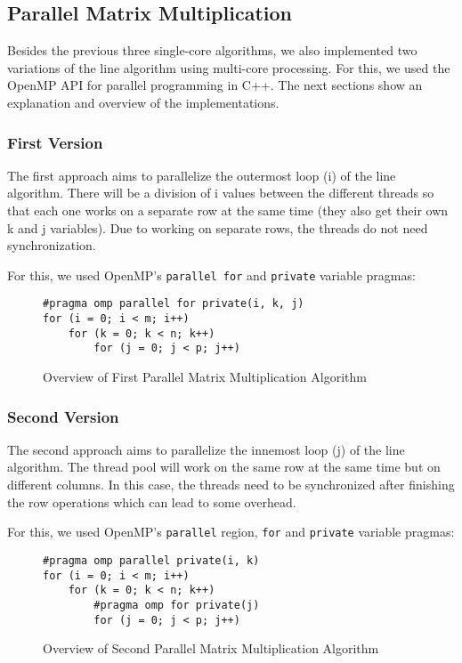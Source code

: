 \subsection{Parallel Matrix Multiplication}

Besides the previous three single-core algorithms, we also implemented two variations of the line algorithm using multi-core processing. For this, we used the OpenMP API for parallel programming in C++. The next sections show an explanation and overview of the implementations.

\subsubsection{First Version}

The first approach aims to parallelize the outermost loop (i) of the line algorithm. There will be a division of i values between the different threads so that each one works on a separate row at the same time (they also get their own k and j variables). Due to working on separate rows, the threads do not need synchronization.

For this, we used OpenMP's \verb#parallel for# and \verb#private# variable pragmas:

\begin{figure}[h!]
\begin{verbatim}
#pragma omp parallel for private(i, k, j)
for (i = 0; i < m; i++)
    for (k = 0; k < n; k++)
        for (j = 0; j < p; j++)
\end{verbatim}
\caption{Overview of First Parallel Matrix Multiplication Algorithm}
\label{fig:algo:parallel1}
\end{figure}

\subsubsection{Second Version}

The second approach aims to parallelize the innemost loop (j) of the line algorithm. The thread pool will work on the same row at the same time but on different columns. In this case, the threads need to be synchronized after finishing the row operations which can lead to some overhead.

For this, we used OpenMP's \verb#parallel# region, \verb#for# and \verb#private# variable pragmas:

\begin{figure}[h!]
\begin{verbatim}
#pragma omp parallel private(i, k)
for (i = 0; i < m; i++)
    for (k = 0; k < n; k++)
        #pragma omp for private(j)
        for (j = 0; j < p; j++)
\end{verbatim}
\caption{Overview of Second Parallel Matrix Multiplication Algorithm}
\label{fig:algo:parallel2}
\end{figure}
